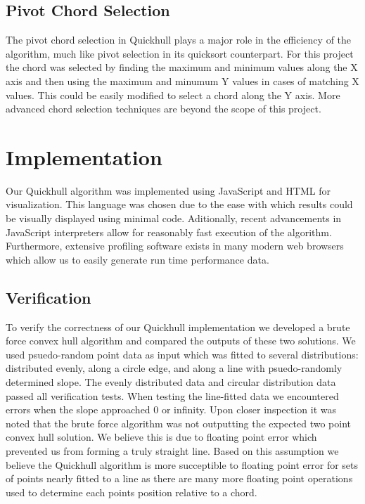 \documentclass[11pt]{article}
\begin{document}
\subsection{Pivot Chord Selection}
The pivot chord selection in Quickhull plays a major role in the efficiency of the algorithm, much like pivot selection in its quicksort counterpart. For this project the chord was selected by finding the maximum and minimum values along the X axis and then using the maximum and minumum Y values in cases of matching X values. This could be easily modified to select a chord along the Y axis. More advanced chord selection techniques are beyond the scope of this project.

\section{Implementation}
Our Quickhull algorithm was implemented using JavaScript and HTML for visualization. This language was chosen due to the ease with which results could be visually displayed using minimal code. Aditionally, recent advancements in JavaScript interpreters allow for reasonably fast execution of the algorithm. Furthermore, extensive profiling software exists in many modern web browsers which allow us to easily generate run time performance data.

\subsection{Verification}
To verify the correctness of our Quickhull implementation we developed a brute force convex hull algorithm and compared the outputs of these two solutions. We used psuedo-random point data as input which was fitted to several distributions: distributed evenly, along a circle edge, and along a line with psuedo-randomly determined slope. The evenly distributed data and circular distribution data passed all verification tests. When testing the line-fitted data we encountered errors when the slope approached 0 or infinity. Upon closer inspection it was noted that the brute force algorithm was not outputting the expected two point convex hull solution. We believe this is due to floating point error which prevented us from forming a truly straight line. Based on this assumption we believe the Quickhull algorithm is more succeptible to floating point error for sets of points nearly fitted to a line as there are many more floating point operations used to determine each points position relative to a chord.
\end{document}

